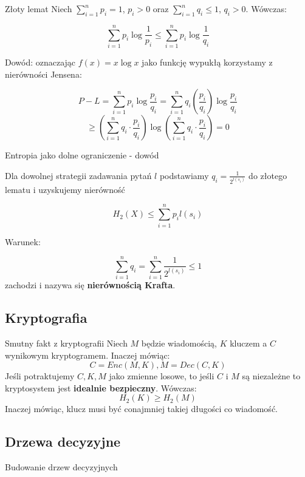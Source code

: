 \documentclass{beamer}
\begin{document}
\begin{frame}{Złoty lemat}
Niech $\sum_{i=1}^{n} p_i = 1$, $p_i > 0$ oraz $\sum_{i=1}^{n} q_i \leq 1$, $q_i > 0$. Wówczas:

$$
\sum_{i=1}^{n} p_i \log{\frac{1}{p_i}} \leq \sum_{i=1}^{n} p_i \log{\frac{1}{q_i}}
$$

Dowód: oznaczając $f(x) = x \log{x}$ jako funkcję wypukłą korzystamy
z nierówności Jensena:

$$
P - L = \sum_{i=1}^{n} p_i \log{\frac{p_i}{q_i}}
= \sum_{i=1}^{n} q_i \left(\frac{p_i}{q_i}\right) \log{\frac{p_i}{q_i}}
$$
$$
\geq \left( \sum_{i=1}^n q_i \cdot \frac{p_i}{q_i} \right) \log{\left( \sum_{i=1}^n q_i \cdot \frac{p_i}{q_i} \right)}
= 0
$$

\end{frame}


\begin{frame}{Entropia jako dolne ograniczenie - dowód}

Dla dowolnej strategii zadawania pytań $l$ podstawiamy
$q_i = \frac{1}{2^{l(s_i)}}$ do złotego lematu i uzyskujemy nierówność

$$
H_2(X) \leq \sum_{i=1}^{n} p_i l(s_i)
$$

Warunek:

$$
\sum_{i=1}^n q_i = \sum_{i=1}^n \frac{1}{2^{l(s_i)}} \leq 1
$$
zachodzi i nazywa się \textbf{nierównością Krafta}.
\end{frame}


\subsection{Kryptografia}

\begin{frame}{Smutny fakt z kryptografii}
Niech $M$ będzie wiadomością, $K$ kluczem a $C$ wynikowym kryptogramem. Inaczej mówiąc:
$$
C = Enc(M, K), M = Dec(C, K)
$$
Jeśli potraktujemy $C, K, M$ jako zmienne losowe, to jeśli $C$ i $M$ są niezależne
to kryptosystem jest \textbf{idealnie bezpieczny}. Wówczas:
$$
H_2(K) \geq H_2(M)
$$
Inaczej mówiąc, klucz musi być conajmniej takiej długości co wiadomość.
\end{frame}


\subsection{Drzewa decyzyjne}

\begin{frame}{Budowanie drzew decyzyjnych}
\end{frame}
\end{document}
